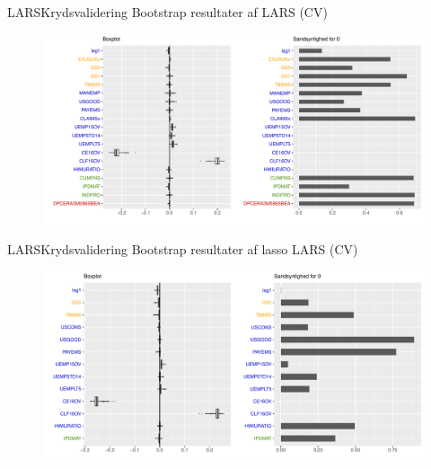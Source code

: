 \begin{frame}{LARS}{Krydsvalidering}
Bootstrap resultater af LARS (CV)
\begin{figure}
\includegraphics[width=1\linewidth, height=0.7\textheight]{slides/boxplot_lars_kryds.pdf}
\end{figure}
\end{frame}

\begin{frame}{LARS}{Krydsvalidering}
Bootstrap resultater af lasso LARS (CV)
\begin{figure}
\includegraphics[width=1\linewidth, height=0.7\textheight]{slides/boxplot_lasso_kryds.pdf}
\end{figure}
\end{frame}

